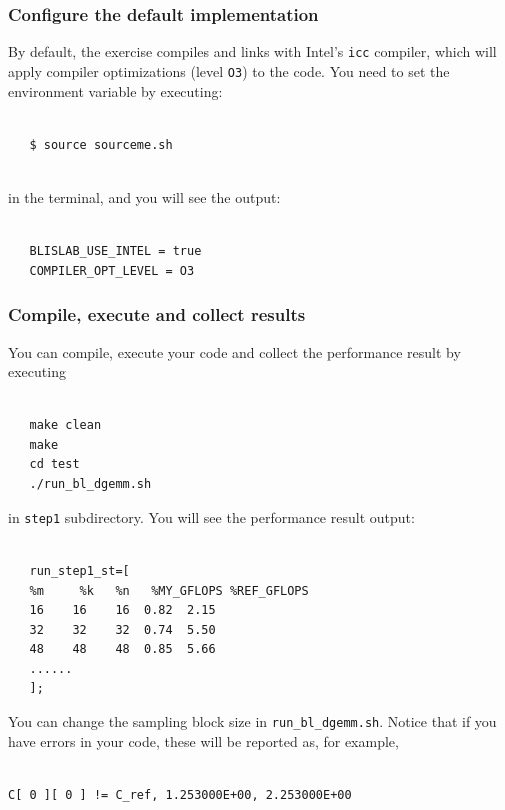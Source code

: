 \subsubsection{Configure the default implementation}
By default, the exercise compiles and links with Intel's {\tt icc} compiler, which will apply compiler optimizations (level {\tt O3}) to the code.
You need to set the environment variable by executing:
\begin{verbatim}

   $ source sourceme.sh
   
\end{verbatim}
in the terminal, and you will see the output:
\begin{verbatim}

   BLISLAB_USE_INTEL = true
   COMPILER_OPT_LEVEL = O3

\end{verbatim}

\subsubsection{Compile, execute and collect results}
You can compile, execute your code and collect the performance result by executing
\begin{verbatim}

   make clean
   make
   cd test
   ./run_bl_dgemm.sh

\end{verbatim}
in {\tt step1} subdirectory. You will see the performance result output:
\begin{verbatim}

   run_step1_st=[
   %m     %k   %n   %MY_GFLOPS %REF_GFLOPS
   16    16    16  0.82  2.15
   32    32    32  0.74  5.50
   48    48    48  0.85  5.66
   ......
   ];

\end{verbatim}
You can change the sampling block size in {\tt run\_bl\_dgemm.sh}.
Notice that if you have errors in your code, these will be reported as, for example, 
\begin{verbatim}

C[ 0 ][ 0 ] != C_ref, 1.253000E+00, 2.253000E+00

\end{verbatim}


